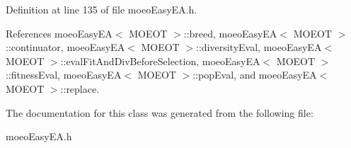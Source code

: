 Definition at line 135 of file moeo\-Easy\-EA.h.

References moeo\-Easy\-EA$<$ MOEOT $>$::breed, moeo\-Easy\-EA$<$ MOEOT $>$::continuator, moeo\-Easy\-EA$<$ MOEOT $>$::diversity\-Eval, moeo\-Easy\-EA$<$ MOEOT $>$::eval\-Fit\-And\-Div\-Before\-Selection, moeo\-Easy\-EA$<$ MOEOT $>$::fitness\-Eval, moeo\-Easy\-EA$<$ MOEOT $>$::pop\-Eval, and moeo\-Easy\-EA$<$ MOEOT $>$::replace.

The documentation for this class was generated from the following file:\begin{CompactItemize}
\item 
moeo\-Easy\-EA.h\end{CompactItemize}
